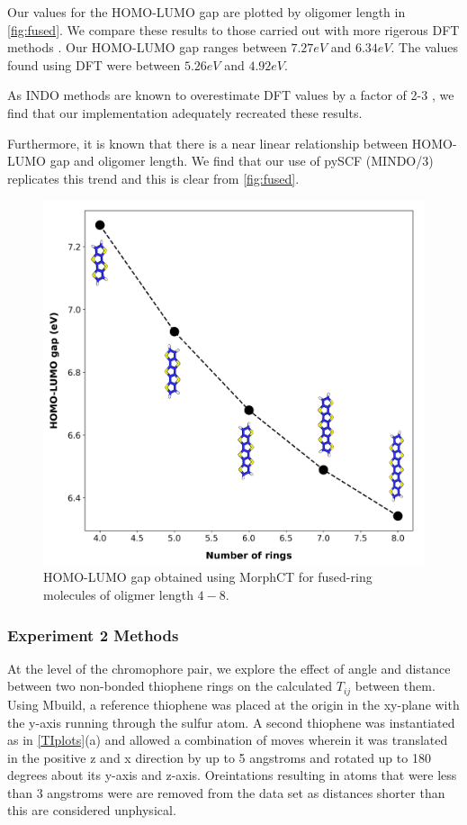 Our values for the HOMO-LUMO gap are plotted by oligomer length in \autoref{fig:fused}. We compare these
results to those carried out with more rigerous DFT methods \cite{Arago2010}. Our HOMO-LUMO gap ranges between
$7.27eV$ and $6.34eV$. The values found using DFT were between $5.26eV$ and $4.92eV$. 

As INDO methods are known to overestimate DFT values by a factor of 2-3 \cite{Gorelsky2001}, we find that our
implementation adequately recreated these results.

Furthermore, it is known that there is a near linear
relationship between HOMO-LUMO gap and oligomer length. We find that our use of pySCF (MINDO/3) replicates
this trend and this is clear from \autoref{fig:fused}.

\begin{figure}
  \center
  \includegraphics[width = .8\textwidth]{figures/fused-ring-figure.png}
  \caption{HOMO-LUMO gap obtained using MorphCT for fused-ring molecules of oligmer length $4-8$.}
  \label{fig:fused}
\end{figure}

\subsubsection{Experiment 2 Methods}

At the level of the chromophore pair, we explore the effect of angle and distance between two non-bonded
thiophene rings on the calculated $T_{ij}$ between them.
Using Mbuild, a reference thiophene was placed at the origin in the xy-plane
with the y-axis running through the sulfur atom. 
A second thiophene was instantiated as in \autoref{TIplots}(a)
and allowed a combination of moves wherein it was translated
in the positive z and x direction by up to 5 angstroms 
and rotated up to 180 degrees about its y-axis and z-axis. Oreintations resulting in atoms that were less
than 3 angstroms were are removed from the data set as distances shorter than this are considered
unphysical.

